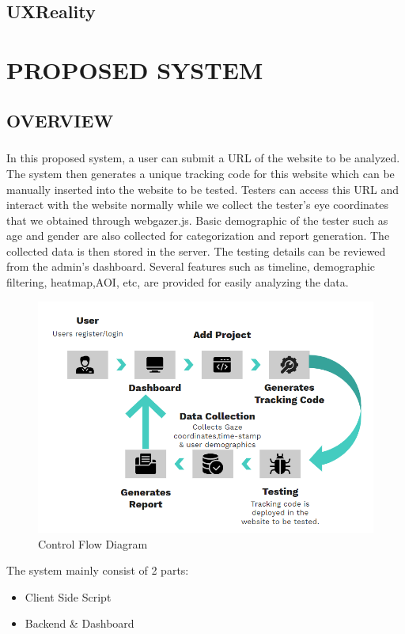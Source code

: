 \documentclass[12pt,a4paper,final]{extreport}
\begin{document}
\section{UXReality}

\newpage
\chapter{PROPOSED SYSTEM}
\section{OVERVIEW}
\paragraph{}
In this proposed system, a user can submit a URL of the website to be analyzed. The system then generates a unique tracking code for this website which can be manually inserted into the website to be tested.
Testers can access this URL and interact with the website normally while we collect the tester's eye coordinates that we obtained through webgazer.js. Basic demographic of the tester such as age and gender are also collected for categorization and report generation. The collected data is then stored in the server. 
The testing details can be reviewed from the admin's dashboard. Several features such as timeline, demographic filtering, heatmap,AOI, etc, are provided for easily analyzing the data.
\begin{figure}[H]
    \centering
    \includegraphics[width=\linewidth]{proposed-method.png}
    \caption{Control Flow Diagram}
\end{figure}
The system mainly consist of 2 parts:
\begin{itemize}
	\item Client Side Script
	\item Backend \& Dashboard
\end{itemize}
\end{document}
